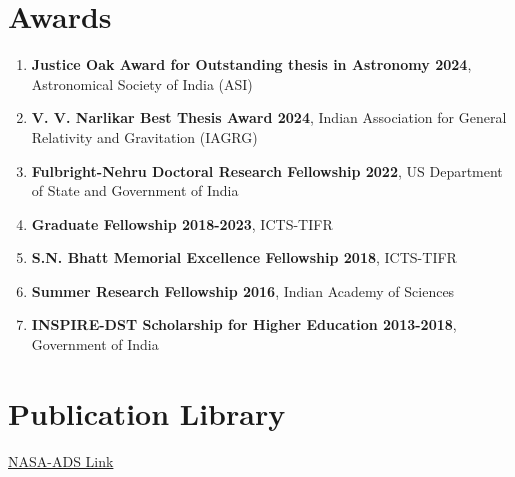 	\section{Awards}
		\begin{enumerate}[leftmargin=*]
                \item \textbf{Justice Oak Award for Outstanding thesis in Astronomy 2024}, Astronomical Society of India (ASI)
                \item \textbf{V. V. Narlikar Best Thesis Award 2024}, {Indian Association for General Relativity and Gravitation (IAGRG)}
			\item  \textbf{Fulbright-Nehru Doctoral Research Fellowship 2022}, US Department of State and Government of India
			\item \textbf{Graduate Fellowship 2018-2023}, ICTS-TIFR
			\item \textbf{S.N. Bhatt Memorial Excellence Fellowship 2018}, ICTS-TIFR
			\item \textbf{Summer Research Fellowship 2016},  Indian Academy of Sciences
			\item \textbf{INSPIRE-DST Scholarship for Higher Education 2013-2018}, Government of India
		\end{enumerate}

            \section{Publication Library}
            \href{https://ui.adsabs.harvard.edu/user/libraries/LqJDfKCTTdeuL_Inb7SwVwx}{NASA-ADS Link}
		
